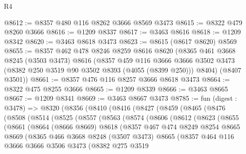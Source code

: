 \begin{lexlean}{R4}
\begin{coremodule}
@8612 := @8357 @480 @116 @8262 @3666 @8569 @3473
@8615 := @8322 @479 @8260 @3666
@8616 := @1209 @8337
@8617 := @3463 @8616
@8618 := @1209 @8342
@8620 := @3463 @8618 @3473
@8623 := @8615 (@8617 @8620) @8569
@8655 := @8357
    @462
    @478
    @8246
    @8259
    @8616
    @8620
    (@8365
      @461
      @3668
      @8245
      (@3503 @3473)
      @8616
      (@8357
        @459
        @116
        @3666
        @3666
        @3502
        @3473
        (@8382 @250 @3519 @90 @3502 @8393 (@4055 (@8399 @250)))
        @8404)
      (@8407 @3501))
@8661 := @8357 @476 @116 @8257 @3666 @8618 @3473
@8664 := @8322 @475 @8255 @3666
@8665 := @1209 @8339
@8666 := @3463 @8665
@8667 := @1209 @8341
@8669 := @3463 @8667 @3473
@8785 := fun (digest : @3478) =>
  @8320
    (@8356
      (@8410
        (@8416
          (@8427
            (@8459
              (@8465
                (@8476
                  (@8508
                    (@8514
                      (@8525
                        (@8557
                          (@8563
                            (@8574
                              (@8606
                                (@8612
                                  (@8623
                                    (@8655
                                      (@8661
                                        (@8664
                                          (@8666 @8669)
                                          @8618
                                          (@8357
                                            @467
                                            @474
                                            @8249
                                            @8254
                                            @8665
                                            @8669
                                            (@8365
                                              @466
                                              @3668
                                              @8248
                                              (@3507 @3473)
                                              @8665
                                              (@8357
                                                @464
                                                @116
                                                @3666
                                                @3666
                                                @3506
                                                @3473
                                                (@8382
                                                  @275
                                                  @3519

\end{coremodule}
\end{lexlean}
